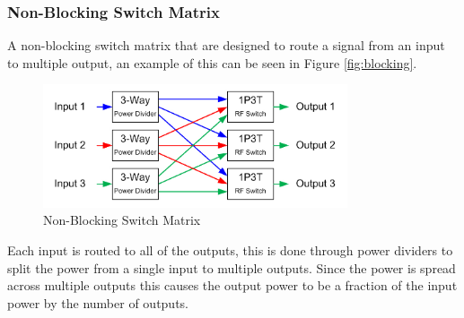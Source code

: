\documentclass[12pt,openany,a4paper]{book}
\begin{document}
\subsubsection{Non-Blocking Switch Matrix}
A non-blocking switch matrix that are designed to route a signal from an input to multiple output, an example of this can be seen in Figure \ref{fig:blocking}.
\begin{figure}[H]
	\centering
    \includegraphics[width=0.8\textwidth]{nonblockingmatrix.jpg}
	\caption{Non-Blocking Switch Matrix}
	\label{fig:nonblocking}
\end{figure} 
Each input is routed to all of the outputs, this is done through power dividers to split the power from a single input to multiple outputs. Since the power is spread across multiple outputs this causes the output power to be a fraction of the input power by the number of outputs. 
\end{document}
